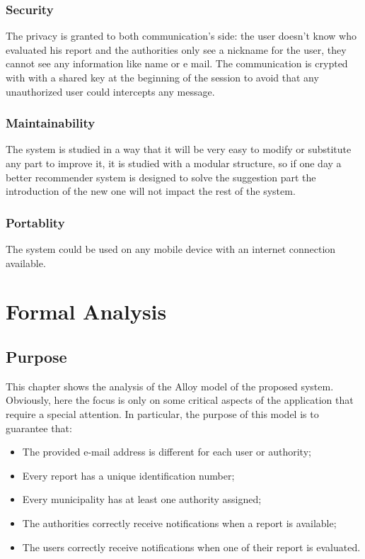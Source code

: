 \documentclass[12pt,a4paper]{report}
\begin{document}
		\subsection{Security}
			The privacy is granted to both communication's side: the user doesn't know who evaluated his report and the authorities
			only see a nickname for the user, they cannot see any information like name or e mail. The communication is crypted with
			with a shared key at the beginning of the session to avoid that any unauthorized user could intercepts any message.
		\subsection{Maintainability}
			The system is studied in a way that it will be very easy to modify or substitute any part to improve it, it is studied
			with a modular structure, so if one day a better recommender system is designed to solve the suggestion part the
			introduction of the new one will not impact the rest of the system.
		\subsection{Portablity}
			The system could be used on any mobile device with an internet connection available.


	

\chapter{Formal Analysis}
	\section{Purpose}
This chapter shows the analysis of the Alloy model of the proposed system. Obviously, here the focus is only on some critical aspects of the application that require a special attention. In particular, the purpose of this model is to guarantee that:
\begin{itemize}
	\item The provided e-mail address is different for each user or authority;
	\item Every report has a unique identification number;
	\item Every municipality has at least one authority assigned;
	\item The authorities correctly receive notifications when a report is available;
	\item The users correctly receive notifications when one of their report is evaluated.
\end{itemize}
\end{document}
